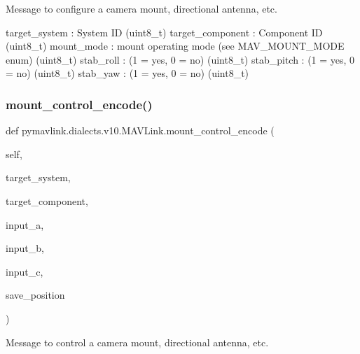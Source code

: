 \begin{DoxyVerb}
\begin{DoxyVerb}
\begin{DoxyVerb}
\begin{DoxyVerb}
\begin{DoxyVerb}Message to configure a camera mount, directional antenna, etc.

target_system             : System ID (uint8_t)
target_component          : Component ID (uint8_t)
mount_mode                : mount operating mode (see MAV_MOUNT_MODE enum) (uint8_t)
stab_roll                 : (1 = yes, 0 = no) (uint8_t)
stab_pitch                : (1 = yes, 0 = no) (uint8_t)
stab_yaw                  : (1 = yes, 0 = no) (uint8_t)\end{DoxyVerb}
 \mbox{\label{classpymavlink_1_1dialects_1_1v10_1_1MAVLink_a71da70a41c58749c9f1ee3494524c3ba}} 
\subsubsection{\texorpdfstring{mount\+\_\+control\+\_\+encode()}{mount\_control\_encode()}}
{\footnotesize\ttfamily def pymavlink.\+dialects.\+v10.\+M\+A\+V\+Link.\+mount\+\_\+control\+\_\+encode (\begin{DoxyParamCaption}\item[{}]{self,  }\item[{}]{target\+\_\+system,  }\item[{}]{target\+\_\+component,  }\item[{}]{input\+\_\+a,  }\item[{}]{input\+\_\+b,  }\item[{}]{input\+\_\+c,  }\item[{}]{save\+\_\+position }\end{DoxyParamCaption})}

\begin{DoxyVerb}Message to control a camera mount, directional antenna, etc.


\end{DoxyVerb}
\end{DoxyVerb}
\end{DoxyVerb}
\end{DoxyVerb}
\end{DoxyVerb}
